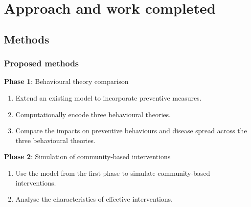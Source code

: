 \documentclass[8pt]{beamer}
\begin{document}
\section{Approach and work completed}

\subsection{Methods}

\begin{frame}
\frametitle{Proposed methods}

        \textbf{Phase 1}: Behavioural theory comparison
        \begin{enumerate}
            \item Extend an existing model \cite{manore_network-patch_2015} to incorporate preventive measures.

            \item Computationally encode three behavioural theories.
            
            \item Compare the impacts on preventive behaviours and disease spread across the three behavioural theories.
        \end{enumerate}
\vspace{1cm}
        \textbf{Phase 2}: Simulation of community-based interventions
        \begin{enumerate}
            \item Use the model from the first phase to simulate community-based interventions.
            \item Analyse the characteristics of effective interventions.
        \end{enumerate}

\end{frame}

\end{document}
